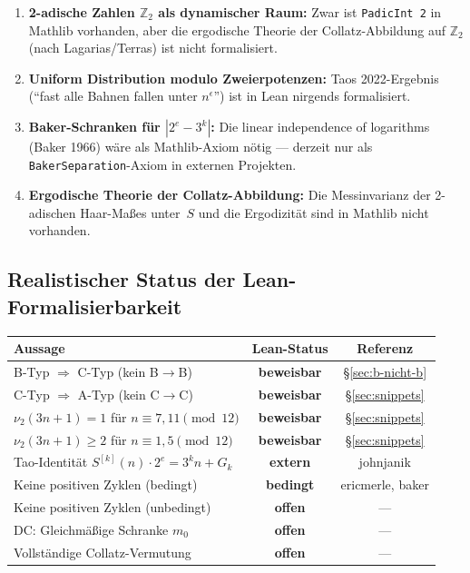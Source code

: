\documentclass[12pt,a4paper]{article}
\newcommand{\vii}{\nu_2}
\newcommand{\Ztwo}{\mathbb{Z}_2}
\newcommand{\Syr}{S}
\begin{document}
\begin{enumerate}[label=(\alph*)]
  \item \textbf{2-adische Zahlen $\Ztwo$ als dynamischer Raum:}
    Zwar ist \lstinline|PadicInt 2| in Mathlib vorhanden,
    aber die ergodische Theorie der Collatz-Abbildung auf $\Ztwo$
    (nach Lagarias/Terras) ist nicht formalisiert.

  \item \textbf{Uniform Distribution modulo Zweierpotenzen:}
    Taos 2022-Ergebnis (``fast alle Bahnen fallen unter $n^\epsilon$'')
    ist in Lean nirgends formalisiert.

  \item \textbf{Baker-Schranken für $|2^e - 3^k|$:}
    Die linear independence of logarithms (Baker 1966) wäre
    als Mathlib-Axiom nötig --- derzeit nur als
    \lstinline|BakerSeparation|-Axiom in externen Projekten.

  \item \textbf{Ergodische Theorie der Collatz-Abbildung:}
    Die Messinvarianz der 2-adischen Haar-Maßes unter~$\Syr$
    und die Ergodizität sind in Mathlib nicht vorhanden.
\end{enumerate}

\subsection{Realistischer Status der Lean-Formalisierbarkeit}

\begin{center}
\begin{tabular}{p{5.5cm}cc}
\toprule
Aussage & Lean-Status & Referenz \\
\midrule
B-Typ $\Rightarrow$ C-Typ (kein B$\to$B) & \textcolor{bewiesengrün}{\textbf{beweisbar}} & \S\ref{sec:b-nicht-b} \\
C-Typ $\Rightarrow$ A-Typ (kein C$\to$C) & \textcolor{bewiesengrün}{\textbf{beweisbar}} & \S\ref{sec:snippets} \\
$\vii(3n+1)=1$ für $n \equiv 7,11 \pmod{12}$ & \textcolor{bewiesengrün}{\textbf{beweisbar}} & \S\ref{sec:snippets} \\
$\vii(3n+1)\geq 2$ für $n \equiv 1,5 \pmod{12}$ & \textcolor{bewiesengrün}{\textbf{beweisbar}} & \S\ref{sec:snippets} \\
Tao-Identität $\Syr^{[k]}(n)\cdot 2^e = 3^k n + G_k$ & \textcolor{warnorange}{\textbf{extern}} & johnjanik \\
Keine positiven Zyklen (bedingt) & \textcolor{warnorange}{\textbf{bedingt}} & ericmerle, baker \\
Keine positiven Zyklen (unbedingt) & \textcolor{lückenrot}{\textbf{offen}} & --- \\
DC: Gleichmäßige Schranke $m_0$ & \textcolor{lückenrot}{\textbf{offen}} & --- \\
Vollständige Collatz-Vermutung & \textcolor{lückenrot}{\textbf{offen}} & --- \\
\bottomrule
\end{tabular}
\end{center}
\end{document}
